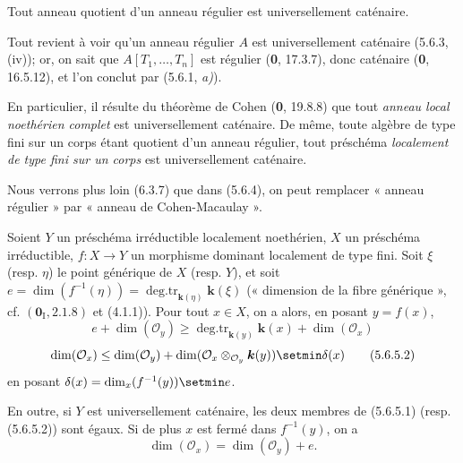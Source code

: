 \begin{proposition}[5.6.4]
\label{IV.2.s5.6.4-fr}
Tout anneau quotient d'un anneau régulier est universellement caténaire.
\end{proposition}

Tout revient à voir qu'un anneau régulier $A$ est universellement caténaire
(5.6.3, (iv)); or, on sait que $A[T_1,\ldots,T_n]$ est régulier (\textbf{0}, 17.3.7),
donc caténaire (\textbf{0}, 16.5.12), et l'on conclut par (5.6.1, \emph{a)}).

En particulier, il résulte du théorème de Cohen (\textbf{0}, 19.8.8) que tout \emph{anneau
local noethérien complet} est universellement caténaire. De même, toute
algèbre de type fini sur un corps étant quotient d'un anneau régulier, tout
préschéma \emph{localement de type fini sur un corps} est universellement caténaire.

Nous verrons plus loin (6.3.7) que dans (5.6.4), on peut remplacer « anneau
régulier » par « anneau de Cohen-Macaulay ».

\begin{proposition}[5.6.5]
Soient $Y$ un préschéma irréductible localement noethérien, $X$ un préschéma
irréductible, $f:X\to Y$ un morphisme dominant localement de type fini. Soit
$\xi$ \textup{(resp. $\eta$)} le point générique de $X$ \textup{(resp. $Y$)}, et soit
$e=\dim(f^{-1}(\eta))=\operatorname{deg.tr}_{\mathbf{k}(\eta)}\boldsymbol{k}(\xi)$
\textup{(« dimension de la fibre générique », cf. $(\mathbf{0}_{\mathrm I},2.1.8)$ et
(4.1.1))}. Pour tout $x\in X$, on a alors, en posant $y=f(x)$,
\begin{equation}
e+\dim(\mathcal O_y)
\geq\operatorname{deg.tr}_{\mathbf{k}(y)}\boldsymbol{k}(x)+\dim(\mathcal O_x)
\tag{5.6.5.1}\label{IV.2.s5.6.5.1-fr}
\end{equation}
\begin{equation}
\dim(\mathcal O_x)
\leq\dim(\mathcal O_y)
+\dim(\mathcal O_x\otimes_{\mathcal O_y}\boldsymbol{k}(y))\setmin\delta(x)
\tag{5.6.5.2}\label{IV.2.s5.6.5.2-fr}
\end{equation}
en posant $\delta(x)=\dim_x(f^{-1}(y))\setmin e$.

En outre, si $Y$ est universellement caténaire, les deux membres de
\textup{(5.6.5.1) (resp. (5.6.5.2))} sont égaux. Si de plus $x$ est fermé dans
$f^{-1}(y)$, on a
\begin{equation}
\dim(\mathcal O_x)=\dim(\mathcal O_y)+e.
\tag{5.6.5.3}\label{IV.2.s5.6.5.3-fr}
\end{equation}
\end{proposition}

